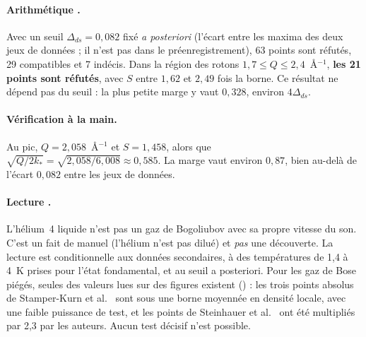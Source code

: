 \paragraph{Arithmétique \tierX.} Avec un seuil $\Delta_{ds}=0{,}082$ fixé \emph{a posteriori} (l'écart entre les maxima des
deux jeux de données ; il n'est pas dans le préenregistrement), 63 points sont réfutés, 29 compatibles et 7 indécis. Dans
la région des rotons $1{,}7\le Q\le2{,}4$~\AA$^{-1}$, \textbf{les 21 points sont réfutés}, avec $S$ entre $1{,}62$ et
$2{,}49$ fois la borne. Ce résultat ne dépend pas du seuil : la plus petite marge y vaut $0{,}328$, environ $4\Delta_{ds}$.

\paragraph{Vérification à la main.} Au pic, $Q=2{,}058$~\AA$^{-1}$ et $S=1{,}458$, alors que
$\sqrt{Q/2k_*}=\sqrt{2{,}058/6{,}008}\approx0{,}585$. La marge vaut environ $0{,}87$, bien au-delà de l'écart $0{,}082$
entre les jeux de données.

\paragraph{Lecture \tierC.} L'hélium~4 liquide n'est pas un gaz de Bogoliubov avec sa propre vitesse du son. C'est un fait
de manuel (l'hélium n'est pas dilué) et \emph{pas} une découverte. La lecture est conditionnelle aux données secondaires,
à des températures de 1,4 à 4~K prises pour l'état fondamental, et au seuil a posteriori. Pour les gaz de Bose piégés,
seules des valeurs lues sur des figures existent (\tierX) : les trois points absolus de Stamper-Kurn et al.~\cite{ch3-sk}
sont sous une borne moyennée en densité locale, avec une faible puissance de test, et les points de Steinhauer et
al.~\cite{ch3-st} ont été multipliés par 2,3 par les auteurs. Aucun test décisif n'est possible.


